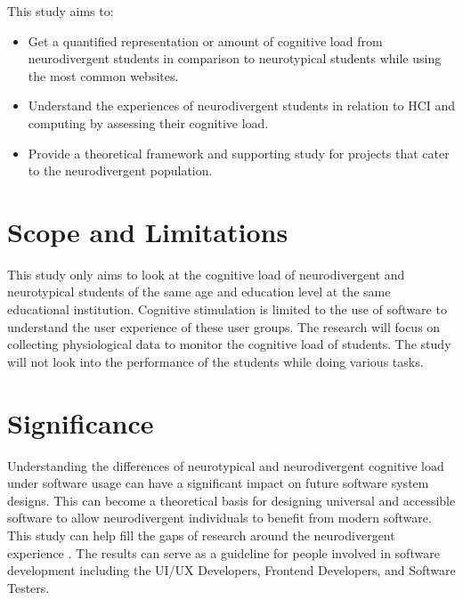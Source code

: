 This study aims to:
\begin{itemize}
    \item Get a quantified representation or amount of cognitive load from neurodivergent students in comparison to neurotypical students while using the most common websites.
    \item Understand the experiences of neurodivergent students in relation to HCI and computing by assessing their cognitive load.
    \item Provide a theoretical framework and supporting study for projects that cater to the neurodivergent population.
\end{itemize} 

\section{Scope and Limitations}
This study only aims to look at the cognitive load of neurodivergent and neurotypical students of the same age and education level at the same educational institution. Cognitive stimulation is limited to the use of software to understand the user experience of these user groups. The research will focus on collecting physiological data to monitor the cognitive load of students. The study will not look into the performance of the students while doing various tasks.

\section{Significance}
Understanding the differences of neurotypical and neurodivergent cognitive load under software usage can have a significant impact on future software system designs. This can become a theoretical basis for designing universal and accessible software to allow neurodivergent individuals to benefit from modern software. This study can help fill the gaps of research around the neurodivergent experience \cite{lecunff2024}. The results can serve as a guideline for people involved in software development including the UI/UX Developers, Frontend Developers, and Software Testers.